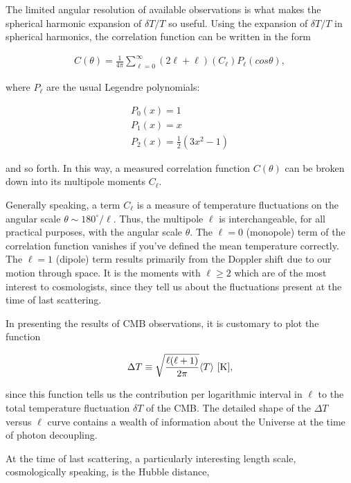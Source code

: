\documentclass[a4paper,11pt]{article}
\begin{document}
{\noindent}The limited angular resolution of available observations is what makes the spherical harmonic expansion of $\delta T/T$ so useful. Using the expansion of $\delta T/T$ in spherical harmonics, the correlation function can be written in the form

\begin{align*}
    C(\theta) = \frac{1}{4\pi} \sum\limits_{\ell=0}^\infty (2\ell+\ell)(C_\ell)P_\ell(cos\theta),
\end{align*}

{\noindent}where $P_\ell$ are the usual Legendre polynomials:

\begin{align*}
    P_0(x) = 1 \\
    P_1(x) = x \\
    P_2(x) = \frac{1}{2}(3x^2-1)
\end{align*}

{\noindent}and so forth. In this way, a measured correlation function $C(\theta)$ can be broken down into its multipole moments $C_\ell$.

{\noindent}Generally speaking, a term $C_\ell$ is a measure of temperature fluctuations on the angular scale $\theta\sim180^\circ/\ell$. Thus, the multipole $\ell$ is interchangeable, for all practical purposes, with the angular scale $\theta$. The $\ell=0$ (monopole) term of the correlation function vanishes if you've defined the mean temperature correctly. The $\ell=1$ (dipole) term results primarily from the Doppler shift due to our motion through space. It is the moments with $\ell\geq2$ which are of the most interest to cosmologists, since they tell us about the fluctuations present at the time of last scattering.

{\noindent}In presenting the results of CMB observations, it is customary to plot the function

\begin{align*}
    \Delta T \equiv \sqrt{\frac{\ell(\ell+1)}{2\pi}}\langle T \rangle ~ [{\rm K}],
\end{align*}

{\noindent}since this function tells us the contribution per logarithmic interval in $\ell$ to the total temperature fluctuation $\delta T$ of the CMB. The detailed shape of the $\Delta T$ versus $\ell$ curve contains a wealth of information about the Universe at the time of photon decoupling. 

{\noindent}At the time of last scattering, a particularly interesting length scale, cosmologically speaking, is the Hubble distance,
\end{document}
